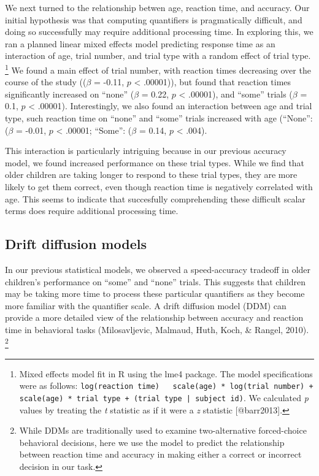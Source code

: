 \documentclass[10pt, letterpaper]{article}
\begin{document}
We next turned to the relationship betwen age, reaction time, and
accuracy. Our initial hypothesis was that computing quantifiers is
pragmatically difficult, and doing so successfully may require
additional processing time. In exploring this, we ran a planned linear
mixed effects model predicting response time as an interaction of age,
trial number, and trial type with a random effect of trial type.
\footnote{Mixed effects model fit in R using the lme4 package. The model specifications were as follows: \texttt{log(reaction time) ~ scale(age) * log(trial number) + scale(age) * trial type + (trial type | subject id)}. We calculated \emph{p} values by treating the \emph{t} statistic as if it were a \emph{z} statistic [@barr2013].}
We found a main effect of trial number, with reaction times decreasing
over the course of the study ((\(\beta\) = -0.11, \(p\) \textless{}
.00001)), but found that reaction times significantly increased on
``none'' (\(\beta\) = 0.22, \(p\) \textless{} .00001), and ``some''
trials (\(\beta\) = 0.1, \(p\) \textless{} .00001). Interestingly, we
also found an interaction between age and trial type, such reaction time
on ``none'' and ``some'' trials increased with age (``None'': (\(\beta\)
= -0.01, \(p\) \textless{} .00001; ``Some'': (\(\beta\) = 0.14, \(p\)
\textless{} .004).

This interaction is particularly intriguing because in our previous
accuracy model, we found increased performance on these trial types.
While we find that older children are taking longer to respond to these
trial types, they are more likely to get them correct, even though
reaction time is negatively correlated with age. This seems to indicate
that succesfully comprehending these difficult scalar terms does require
additional processing time.

\subsection{Drift diffusion models}\label{drift-diffusion-models}

In our previous statistical models, we observed a speed-accuracy
tradeoff in older children's performance on ``some'' and ``none''
trials. This suggests that children may be taking more time to process
these particular quantifiers as they become more familiar with the
quantifier scale. A drift diffusion model (DDM) can provide a more
detailed view of the relationship between accuracy and reaction time in
behavioral tasks (Milosavljevic, Malmaud, Huth, Koch, \& Rangel, 2010).
\footnote{While DDMs are traditionally used to examine two-alternative forced-choice behavioral decisions, here we use the model to predict the relationship between reaction time and accuracy in making either a correct or incorrect decision in our task.}
\end{document}
